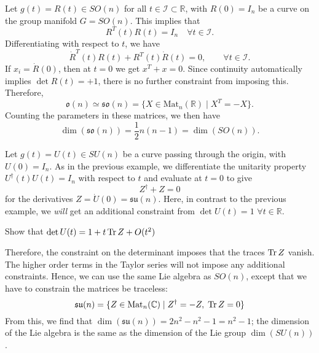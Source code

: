 \begin{example}[G = SO(n)]
  Let $g(t) = R(t) \in SO(n)$ for all $t \in \mathcal{I} \subset \mathbb{R}$, with $R(0) = I_n$ be a curve on the group manifold $G = SO(n)$.
  This implies that
  \begin{equation}
    R^T(t) R(t) = I_n \quad \forall t \in \mathcal{I}.
  \end{equation}
  Differentiating with respect to $t$, we have
  \begin{equation}
    \dot R^T (t) R(t) + R^T(t) \dot R(t) = 0, \qquad \forall t \in \mathcal{I}.
  \end{equation}
  If $x_i = \dot R(0)$, then at $t =0$ we get $x^T + x = 0$.
  Since continuity automatically implies $\det R(t) = +1$, there is no further constraint from imposing this.
  Therefore,
  \begin{equation}
    \mathfrak{o}(n) \simeq \mathfrak{so}(n) = \{ X \in \text{Mat}_n(\mathbb{R}) \mid X^T = -X \}.
  \end{equation}
  Counting the parameters in these matrices, we then have 
  \begin{equation}
    \dim(\mathfrak{so}(n)) = \frac{1}{2} n (n - 1) = \dim(SO(n)).
  \end{equation}
\end{example}

\begin{example}[G = SU(n)]
  Let $g(t) = U(t) \in SU(n)$ be a curve passing through the origin, with $U(0) = I_n$.
  As in the previous example, we differentiate the unitarity property $U^{\dagger}(t) U(t) = I_n$ with respect to $t$ and evaluate at $t = 0$ to give
  \begin{equation}
    Z^{\dagger} + Z = 0
  \end{equation}
  for the derivatives $Z = \dot U(0) = \mathfrak{su}(n)$.
  Here, in contrast to the previous example, we \emph{will} get an additional constraint from $\det U(t) = 1$ $\forall t \in \mathbb{R}$.

  \begin{exercise}
    Show that $\det U(t) = 1 + t \Tr Z + O(t^2)$
  \end{exercise}
  Therefore, the constraint on the determinant imposes that the traces $\Tr Z$ vanish.
  The higher order terms in the Taylor series will not impose any additional constraints.
  Hence, we can use the same Lie algebra as $SO(n)$, except that we have to constrain the matrices be traceless:
  \begin{equation}
    \mathfrak{su}(n) = \{Z \in \text{Mat}_n(\mathbb{C}) \mid Z^{\dagger} = -Z, \; \Tr Z = 0\}
  \end{equation}
  From this, we find that $\dim(\mathfrak{su}(n)) = 2n^2 - n^2 - 1 = n^2 - 1$; the dimension of the Lie algebra is the same as the dimension of the Lie group $\dim(SU(n))$.
\end{example}

